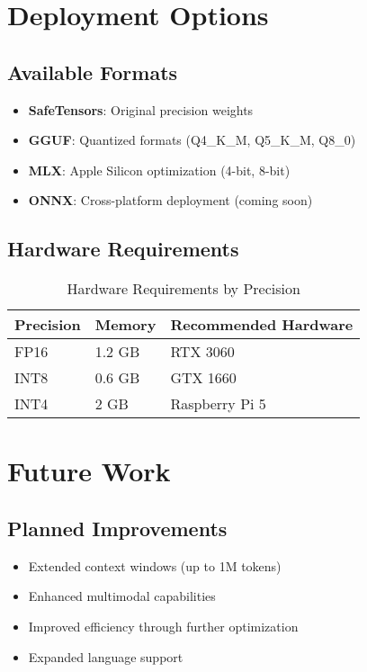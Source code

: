 \documentclass[11pt,a4paper]{article}
\begin{document}
\section{Deployment Options}

\subsection{Available Formats}
\begin{itemize}
    \item \textbf{SafeTensors}: Original precision weights
    \item \textbf{GGUF}: Quantized formats (Q4\_K\_M, Q5\_K\_M, Q8\_0)
    \item \textbf{MLX}: Apple Silicon optimization (4-bit, 8-bit)
    \item \textbf{ONNX}: Cross-platform deployment (coming soon)
\end{itemize}

\subsection{Hardware Requirements}
\begin{table}[H]
\centering
\begin{tabular}{lll}
\toprule
\textbf{Precision} & \textbf{Memory} & \textbf{Recommended Hardware} \\
\midrule
FP16 & 1.2 GB & RTX 3060 \\
INT8 & 0.6 GB & GTX 1660 \\
INT4 & 2 GB & Raspberry Pi 5 \\
\bottomrule
\end{tabular}
\caption{Hardware Requirements by Precision}
\end{table}

\section{Future Work}

\subsection{Planned Improvements}
\begin{itemize}
    \item Extended context windows (up to 1M tokens)
    \item Enhanced multimodal capabilities
    \item Improved efficiency through further optimization
    \item Expanded language support
\end{itemize}
\end{document}
